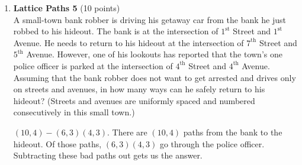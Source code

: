\begin{enumerate}
  \item \textbf{Lattice Paths 5} (10 points)\\
  A small-town bank robber is driving his getaway car from the bank he just 
robbed to his hideout. The bank is at the intersection of $1^{\text{st}}$ Street and $1^{\text{st}}$ Avenue. He needs to return to his hideout at the intersection of $7^{\text{th}}$ Street and $5^{\text{th}}$ Avenue. However, one of his lookouts has reported that the town's one police officer is parked at the intersection of $4^{\text{th}}$ Street and $4^{\text{th}}$ Avenue. Assuming that the bank robber does not want to get arrested and drives only on streets and avenues, in how many ways can he safely return to his hideout? (Streets and avenues are uniformly spaced and numbered consecutively in this small town.)
  \begin{subanswer}
    $(10,4)-(6,3)(4,3)$. There are $(10,4)$ paths from the bank to the hideout. Of those paths, $(6,3)(4,3)$ go through the police officer. Subtracting these bad paths out gets us the answer.
  \end{subanswer}



\end{enumerate}

